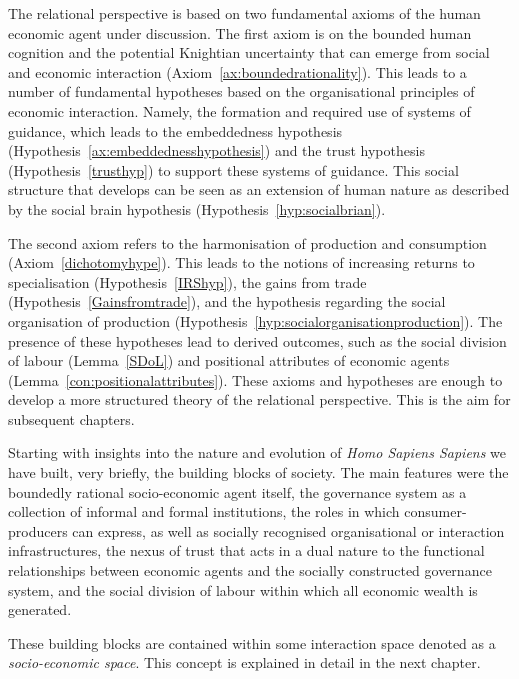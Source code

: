 The relational perspective is based on two fundamental axioms of the human economic agent under discussion. The first axiom is on the bounded human cognition and the potential Knightian uncertainty that can emerge from social and economic interaction (Axiom~\ref{ax:boundedrationality}). This leads to a number of fundamental hypotheses based on the organisational principles of economic interaction. Namely, the formation and required use of systems of guidance, which leads to the embeddedness hypothesis (Hypothesis~\ref{ax:embeddednesshypothesis}) and the trust hypothesis (Hypothesis~\ref{trusthyp}) to support these systems of guidance. This social structure that develops can be seen as an extension of human nature as described by the social brain hypothesis (Hypothesis~\ref{hyp:socialbrian}).

The second axiom refers to the harmonisation of production and consumption (Axiom~\ref{dichotomyhype}). This leads to the notions of increasing returns to specialisation (Hypothesis~\ref{IRShyp}), the gains from trade (Hypothesis~\ref{Gainsfromtrade}), and the hypothesis regarding the social organisation of production (Hypothesis~\ref{hyp:socialorganisationproduction}). The presence of these hypotheses lead to derived outcomes, such as the social division of labour (Lemma~\ref{SDoL}) and positional attributes of economic agents (Lemma~\ref{con:positionalattributes}). These axioms and hypotheses are enough to develop a more structured theory of the relational perspective. This is the aim for subsequent chapters.

\medskip\noindent Starting with insights into the nature and evolution of \emph{Homo Sapiens Sapiens} we have built, very briefly, the building blocks of society. The main features were the boundedly rational socio-economic agent itself, the governance system as a collection of informal and formal institutions, the roles in which consumer-producers can express, as well as socially recognised organisational or interaction infrastructures, the nexus of trust that acts in a dual nature to the functional relationships between economic agents and the socially constructed governance system, and the social division of labour within which all economic wealth is generated.

These building blocks are contained within some interaction space denoted as a \emph{socio-economic space}. This concept is explained in detail in the next chapter.

